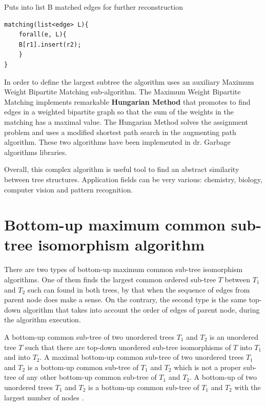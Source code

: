 \documentclass{report}
\begin{document}
Puts into list B matched edges for further reconstruction
\begin{lstlisting}
matching(list<edge> L){
	forall(e, L){
	B[r1].insert(r2);
	}
}
\end{lstlisting}

In order to define the largest subtree the algorithm uses an auxiliary Maximum Weight Bipartite Matching sub-algorithm. The Maximum Weight Bipartite Matching implements remarkable \textbf{Hungarian Method} that promotes to find edges in a weighted bipartite graph so that the sum of the weights in the matching has a maximal value. The Hungarian Method solves the assignment problem and uses a modified shortest path search in the augmenting path algorithm. These two algorithms have been implemented in dr. Garbage algorithms libraries.

Overall, this complex algorithm is useful tool to find an abstract similarity between tree structures. Application fields can be very various: chemistry, biology, computer vision and pattern recognition.

\section{Bottom-up maximum common sub-tree isomorphism algorithm }
\label{sec:bottomup}

There are two types of bottom-up maximum common sub-tree isomorphism algorithms. One of them finds the largest common ordered sub-tree $T$ between $ T_{1}$ and $ T_{2}$ such can found in both trees, by that when the sequence of edges from parent node does make a sense. On the contrary, the second type is the same top-down algorithm that takes into account the order of edges of parent node, during the algorithm execution. 

A bottom-up common sub-tree of two unordered trees $ T_{1}$ and $ T_{2 }$ is an unordered tree $T$ such that there are top-down unordered sub-tree isomorphisms of $ T$ into $ T_{1}$ and into $ T_{2}$. A maximal bottom-up common sub-tree of two unordered  trees $ T_{1}$ and $ T_{2}$ is a bottom-up common sub-tree of $ T_{1}$ and $ T_{2}$ which is not a proper sub-tree of any other bottom-up common sub-tree of $ T_{1}$ and $ T_{2}$. A bottom-up of two unordered trees $ T_{1}$ and $ T_{2}$ is a bottom-up common sub-tree of $ T_{1}$ and $ T_{2}$ with the largest number of nodes \cite{valiente}.
\end{document}
